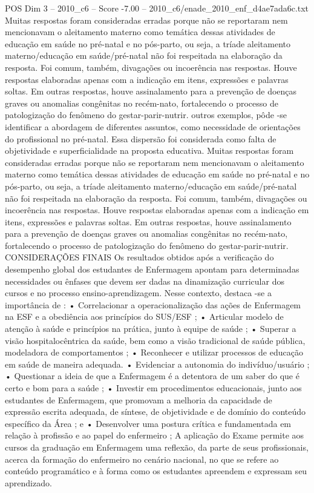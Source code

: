 \begin{textsample}{POS Dim 3 – 2010\_c6 – Score -7.00 – 2010\_c6/enade\_2010\_enf\_d4ae7ada6c.txt}
Muitas respostas foram consideradas erradas porque não se reportaram nem mencionavam o aleitamento materno como temática dessas atividades de educação em saúde no pré-natal e no pós-parto, ou seja, a tríade aleitamento materno/educação em saúde/pré-natal não foi respeitada na elaboração da resposta.
Foi comum, também, divagações ou incoerência nas respostas.
Houve respostas elaboradas apenas com a indicação em itens, expressões e palavras soltas.
Em outras respostas, houve assinalamento para a prevenção de doenças graves ou anomalias congênitas no recém-nato, fortalecendo o processo de patologização do fenômeno do gestar-parir-nutrir. outros exemplos, pôde -se identificar a abordagem de diferentes assuntos, como necessidade de orientações do profissional no pré-natal.
Essa dispersão foi considerada como falta de objetividade e superficialidade na proposta educativa.
Muitas respostas foram consideradas erradas porque não se reportaram nem mencionavam o aleitamento materno como temática dessas atividades de educação em saúde no pré-natal e no pós-parto, ou seja, a tríade aleitamento materno/educação em saúde/pré-natal não foi respeitada na elaboração da resposta.
Foi comum, também, divagações ou incoerência nas respostas.
Houve respostas elaboradas apenas com a indicação em itens, expressões e palavras soltas.
Em outras respostas, houve assinalamento para a prevenção de doenças graves ou anomalias congênitas no recém-nato, fortalecendo o processo de patologização do fenômeno do gestar-parir-nutrir.
CONSIDERAÇÕES FINAIS Os resultados obtidos após a verificação do desempenho global dos estudantes de Enfermagem apontam para determinadas necessidades ou ênfases que devem ser dadas na dinamização curricular dos cursos e no processo ensino-aprendizagem.
Nesse contexto, destaca -se a importância de : • Correlacionar a operacionalização das ações de Enfermagem na ESF e a obediência aos princípios do SUS/ESF ; • Articular modelo de atenção à saúde e princípios na prática, junto à equipe de saúde ; • Superar a visão hospitalocêntrica da saúde, bem como a visão tradicional de saúde pública, modeladora de comportamentos ; • Reconhecer e utilizar processos de educação em saúde de maneira adequada. • Evidenciar a autonomia do indivíduo/usuário ; • Questionar a ideia de que a Enfermagem é a detentora de um saber do que é certo e bom para a saúde ; • Investir em procedimentos educacionais, junto aos estudantes de Enfermagem, que promovam a melhoria da capacidade de expressão escrita adequada, de síntese, de objetividade e de domínio do conteúdo específico da Área ; e • Desenvolver uma postura crítica e fundamentada em relação à profissão e ao papel do enfermeiro ; A aplicação do Exame permite aos cursos da graduação em Enfermagem uma reflexão, da parte de seus profissionais, acerca da formação do enfermeiro no cenário nacional, no que se refere ao conteúdo programático e à forma como os estudantes apreendem e expressam seu aprendizado.

\end{textsample}

